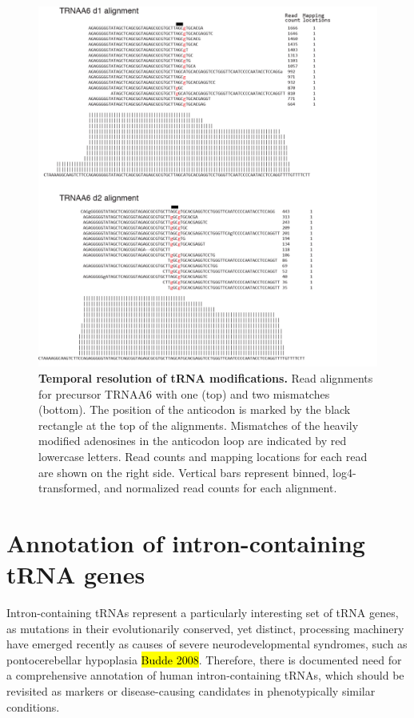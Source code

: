 \documentclass[12pt]{rockefeller}
\begin{document}
\begin{figure}[!ht]%
\centering
\includegraphics[width = 5in]{paper7b.png}%
\caption[Temporal resolution of tRNA modifications]
{\textbf{Temporal resolution of tRNA modifications.}
Read alignments for precursor TRNAA6 with one (top) and two mismatches (bottom). The position of the anticodon is marked by the black rectangle at the top of the alignments. Mismatches of the heavily modified adenosines in the anticodon loop are indicated by red lowercase letters. Read counts and mapping locations for each read are shown on the right side. Vertical bars represent binned, log4-transformed, and normalized read counts for each alignment.}
\centering
\label{paper7b}%
\end{figure}

\section{Annotation of intron-containing tRNA genes} \label{introns}

Intron-containing tRNAs represent a particularly interesting set of tRNA genes, as mutations in their evolutionarily conserved, yet distinct, processing machinery have emerged recently as causes of severe neurodevelopmental syndromes, such as pontocerebellar hypoplasia \cite{Cooper:2009da,Namavar:2011ew,Weitzer:2014bi} \hl{Budde 2008}. Therefore, there is documented need for a comprehensive annotation of human intron-containing tRNAs, which should be revisited as markers or disease-causing candidates in phenotypically similar conditions. 
\end{document}

